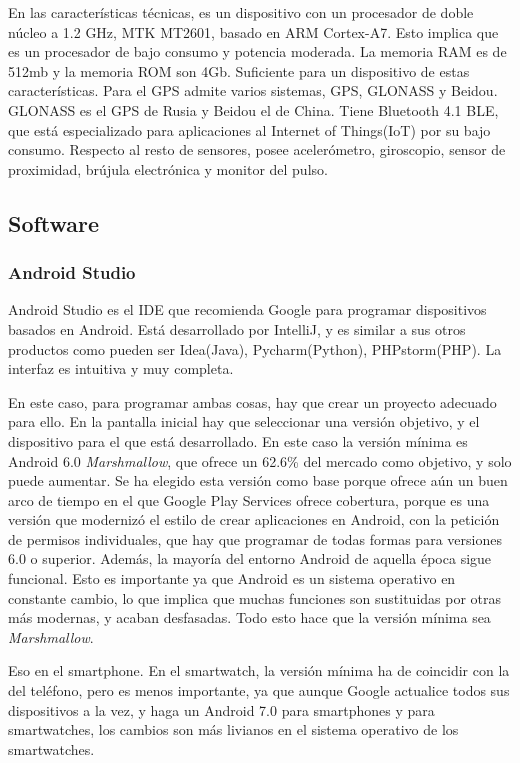 \documentclass[12pt]{article}
\numberwithin{equation}{section}
\begin{document}
En las características técnicas, es un dispositivo con un procesador de doble núcleo a 1.2 GHz, MTK MT2601, basado en ARM Cortex-A7. Esto implica que es un procesador de bajo consumo y potencia moderada. La memoria RAM es de 512mb y la memoria ROM son 4Gb. Suficiente para un dispositivo de estas características. Para el GPS admite varios sistemas, GPS, GLONASS y Beidou. GLONASS es el GPS de Rusia y Beidou el de China. Tiene Bluetooth 4.1 BLE, que está especializado para aplicaciones al Internet of Things(IoT) por su bajo consumo. Respecto al resto de sensores, posee acelerómetro, giroscopio, sensor de proximidad, brújula electrónica y monitor del pulso.

\subsection{Software}

\subsubsection{Android Studio}

Android Studio es el IDE que recomienda Google para programar dispositivos basados en Android. Está desarrollado por IntelliJ, y es similar a sus otros productos como pueden ser Idea(Java), Pycharm(Python), PHPstorm(PHP). La interfaz es intuitiva y muy completa.

En este caso, para programar ambas cosas, hay que crear un proyecto adecuado para ello. En la pantalla inicial hay que seleccionar una versión objetivo, y el dispositivo para el que está desarrollado. En este caso la versión mínima es Android 6.0 \textit{Marshmallow}, que ofrece un 62.6\% del mercado como objetivo, y solo puede aumentar. Se ha elegido esta versión como base porque ofrece aún un buen arco de tiempo en el que Google Play Services ofrece cobertura, porque es una versión que modernizó el estilo de crear aplicaciones en Android, con la petición de permisos individuales, que hay que programar de todas formas para versiones 6.0 o superior. Además, la mayoría del entorno Android de aquella época sigue funcional. Esto es importante ya que Android es un sistema operativo en constante cambio, lo que implica que muchas funciones son sustituidas por otras más modernas, y acaban desfasadas. Todo esto hace que la versión mínima sea \textit{Marshmallow}.

Eso en el smartphone. En el smartwatch, la versión mínima ha de coincidir con la del teléfono, pero es menos importante, ya que aunque Google actualice todos sus dispositivos a la vez, y haga un Android 7.0 para smartphones y para smartwatches, los cambios son más livianos en el sistema operativo de los smartwatches.
\end{document}
